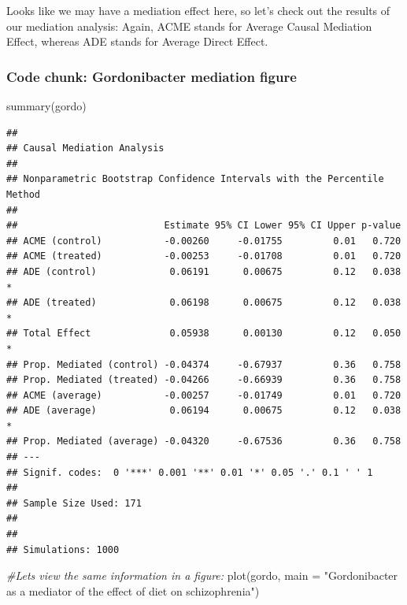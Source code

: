 \documentclass[
]{article}
\newenvironment{Shaded}{\begin{snugshade}}{\end{snugshade}}
\newcommand{\AttributeTok}[1]{\textcolor[rgb]{0.77,0.63,0.00}{#1}}
\newcommand{\CommentTok}[1]{\textcolor[rgb]{0.56,0.35,0.01}{\textit{#1}}}
\newcommand{\FunctionTok}[1]{\textcolor[rgb]{0.00,0.00,0.00}{#1}}
\newcommand{\NormalTok}[1]{#1}
\newcommand{\StringTok}[1]{\textcolor[rgb]{0.31,0.60,0.02}{#1}}
\begin{document}
Looks like we may have a mediation effect here, so let's check out the
results of our mediation analysis: Again, ACME stands for Average Causal
Mediation Effect, whereas ADE stands for Average Direct Effect.

\hypertarget{code-chunk-gordonibacter-mediation-figure}{%
\subsubsection{Code chunk: Gordonibacter mediation
figure}\label{code-chunk-gordonibacter-mediation-figure}}

\begin{Shaded}
\begin{Highlighting}[]
\FunctionTok{summary}\NormalTok{(gordo)}
\end{Highlighting}
\end{Shaded}

\begin{verbatim}
## 
## Causal Mediation Analysis 
## 
## Nonparametric Bootstrap Confidence Intervals with the Percentile Method
## 
##                          Estimate 95% CI Lower 95% CI Upper p-value  
## ACME (control)           -0.00260     -0.01755         0.01   0.720  
## ACME (treated)           -0.00253     -0.01708         0.01   0.720  
## ADE (control)             0.06191      0.00675         0.12   0.038 *
## ADE (treated)             0.06198      0.00675         0.12   0.038 *
## Total Effect              0.05938      0.00130         0.12   0.050 *
## Prop. Mediated (control) -0.04374     -0.67937         0.36   0.758  
## Prop. Mediated (treated) -0.04266     -0.66939         0.36   0.758  
## ACME (average)           -0.00257     -0.01749         0.01   0.720  
## ADE (average)             0.06194      0.00675         0.12   0.038 *
## Prop. Mediated (average) -0.04320     -0.67536         0.36   0.758  
## ---
## Signif. codes:  0 '***' 0.001 '**' 0.01 '*' 0.05 '.' 0.1 ' ' 1
## 
## Sample Size Used: 171 
## 
## 
## Simulations: 1000
\end{verbatim}

\begin{Shaded}
\begin{Highlighting}[]
\CommentTok{\#Let\textquotesingle{}s view the same information in a figure:}
\FunctionTok{plot}\NormalTok{(gordo, }\AttributeTok{main =} \StringTok{"Gordonibacter as a mediator of the effect of diet on schizophrenia"}\NormalTok{)}
\end{Highlighting}
\end{Shaded}
\end{document}
